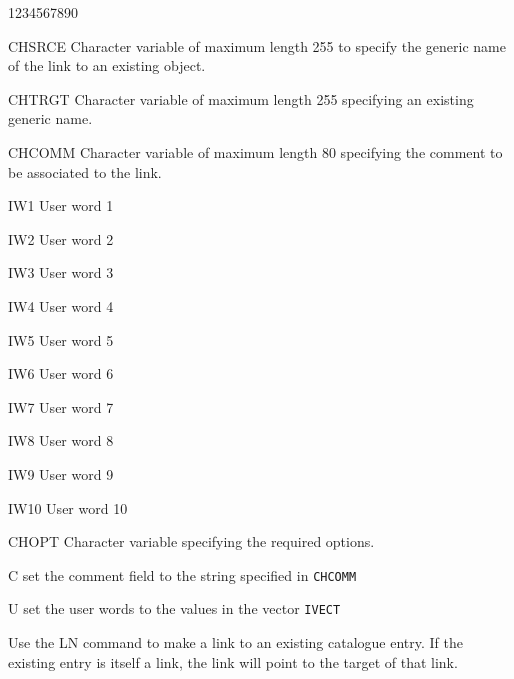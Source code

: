 \begin{DLtt}{1234567890}
\item[CHSRCE]
Character variable of maximum length 255 to specify the generic name of
the link to an existing object.
\item[CHTRGT]
Character variable of maximum length 255 specifying an existing generic name.
\item[CHCOMM]
Character variable of maximum length 80 specifying the comment to 
be associated to the link. 
\item[IW1]
User word 1
\item[IW2]
User word 2
\item[IW3]
User word 3
\item[IW4]
User word 4
\item[IW5]
User word 5
\item[IW6]
User word 6
\item[IW7]
User word 7
\item[IW8]
User word 8
\item[IW9]
User word 9
\item[IW10]
User word 10
\item[CHOPT]
Character variable specifying the required options.
\begin{DLtt}{12}
\item[C]set the comment field to the string specified in {\tt CHCOMM}
\item[U]set the user words to the values in the vector {\tt IVECT}
\end{DLtt}
\end{DLtt}
Use the LN command to make a link to an existing catalogue entry.
If the existing entry is itself a link, the link will point to the
target of that link.
